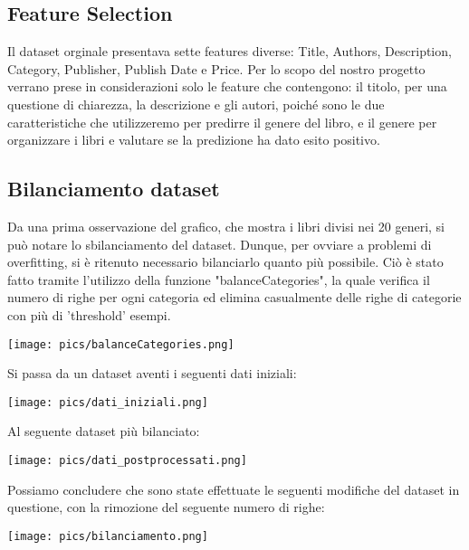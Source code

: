 \documentclass[12pt,oneside]{article}
\begin{document}
    \begin{enumerate}
    \subsection{Feature Selection}
    \begin{justify}
    Il dataset orginale presentava sette features diverse: Title, Authors, Description, Category, Publisher, Publish Date e Price. Per lo scopo del nostro progetto verrano prese in considerazioni solo le feature che contengono: il titolo, per una questione di chiarezza, la descrizione e gli autori, poiché sono le due caratteristiche che utilizzeremo per predirre il genere del libro, e il genere per organizzare i libri e valutare se la predizione ha dato esito positivo.
    \end{justify}
    \end{enumerate}

    \begin{enumerate}
    \subsection{Bilanciamento dataset}
    \begin{justify}
    Da una prima osservazione del grafico, che mostra i libri divisi nei 20 generi, si può notare lo sbilanciamento del dataset. Dunque, per ovviare a problemi di overfitting, si è ritenuto necessario bilanciarlo quanto più possibile. Ciò è stato fatto tramite l'utilizzo della funzione "balanceCategories", la quale verifica il numero di righe per ogni categoria ed elimina casualmente delle righe di categorie con più di 'threshold' esempi.
    \end{justify}
    \texttt{[image: pics/balanceCategories.png]}
    \begin{justify}
    Si passa da un dataset aventi i seguenti dati iniziali:
    \end{justify}
    \texttt{[image: pics/dati\_iniziali.png]}
    \begin{justify}
    Al seguente dataset più bilanciato:
    \end{justify}
    \texttt{[image: pics/dati\_postprocessati.png]}

    \begin{minipage}[t]{0.40\textwidth}
    \vspace{30pt}
    Possiamo concludere che sono state effettuate le seguenti modifiche del dataset in questione, con la rimozione del seguente numero di righe:
    \end{minipage}
    \hfill
    \begin{minipage}[t]{0.50\textwidth}
    \vspace{20pt}
    \texttt{[image: pics/bilanciamento.png]}
    \end{minipage}
    \end{enumerate}
\end{document}
